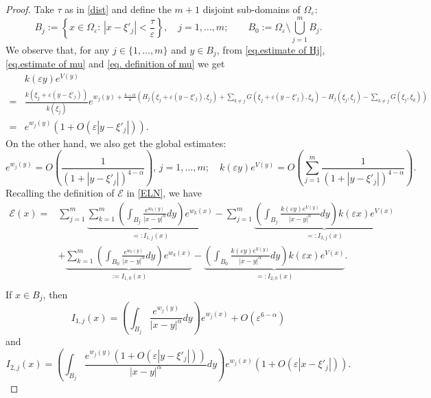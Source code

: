 \documentclass[11pt]{article}
\begin{document}
\begin{proof}
Take $\tau$ as in \eqref{dist} and define the $m+1$ disjoint sub-domains of $\Omega_\varepsilon$:
\begin{equation}\label{bj}
B_j:=\left\{x\in\Omega_\varepsilon:\,\left|x-\xi'_j\right|<\frac\tau\varepsilon\right\},\quad j=1,\dots,m;\qquad B_0:=\Omega_\varepsilon\setminus\bigcup_{j=1}^mB_j.
\end{equation}
We observe that, for any $j\in\{1,\dots,m\}$ and $y\in B_j$, from \eqref{eq.estimate of Hj}, \eqref{eq.estimate of mu} and \eqref{eq. definition of mu} we get
\begin{align}
\nonumber&k(\varepsilon y)e^{V(y)}\\
\nonumber=&\frac{k\left(\xi_j+\varepsilon\left(y-\xi'_j\right)\right)}{k(\xi_j)}e^{w_j(y)+\frac{4-\alpha}4\left(H_j\left(\xi_j+\varepsilon\left(y-\xi'_j\right),\xi_j\right)+\sum_{k\ne j}G\left(\xi_j+\varepsilon\left(y-\xi'_j\right),\xi_k\right)-H_j(\xi_j,\xi_j)-\sum_{k\ne j}G(\xi_j,\xi_k)\right)}\\
\label{eq. in ball}=&e^{w_j(y)}\left(1+O\left(\varepsilon\left|y-\xi'_j\right|\right)\right).
\end{align}
On the other hand, we also get the global estimates:
\begin{equation}\label{eq. out ball}
e^{w_j(y)}=O\left(\frac1{\left(1+\left|y-\xi'_j\right|\right)^{4-\alpha}}\right),\,j=1,\dots,m;\quad k(\varepsilon y)e^{V(y)}=O\left(\sum_{j=1}^m\frac1{\left(1+\left|y-\xi'_j\right|\right)^{4-\alpha}}\right).
\end{equation}
Recalling the definition of $\mathcal E$ in \eqref{ELN}, we have
\begin{align*}
\mathcal E(x)=&\sum_{j=1}^m\underbrace{\sum_{k=1}^m\left(\int_{B_j}\frac{e^{w_k(y)}}{|x-y|^\alpha}dy\right)e^{w_k(x)}}_{=:I_{1,j}(x)}-\sum_{j=1}^m\underbrace{\left(\int_{B_j}\frac{k(\varepsilon y)e^{V(y)}}{|x-y|^\alpha}dy\right)k(\varepsilon x)e^{V(x)}}_{=:I_{2,j}(x)}\\
&+\underbrace{\sum_{k=1}^m\left(\int_{B_0}\frac{e^{w_k(y)}}{|x-y|^\alpha}dy\right)e^{w_k(x)}}_{:=I_{1,0}(x)}-\underbrace{\left(\int_{B_0}\frac{k(\varepsilon y)e^{V(y)}}{|x-y|^\alpha}dy\right)k(\varepsilon x)e^{V(x)}}_{=:I_{2,0}(x)}.\\
\end{align*}
If $x\in B_j$, then
$$I_{1,j}(x)=\left(\int_{B_j}\frac{e^{w_j(y)}}{|x-y|^\alpha}dy\right)e^{w_j(x)}+O\left(\varepsilon^{6-\alpha}\right)$$
and
$$I_{2,j}(x)=\left(\int_{B_j}\frac{e^{w_j(y)}\left(1+O\left(\varepsilon\left|y-\xi'_j\right|\right)\right)}{|x-y|^\alpha}dy\right)e^{w_j(x)}\left(1+O\left(\varepsilon\left|x-\xi'_j\right|\right)\right).$$

\end{proof}
\end{document}
